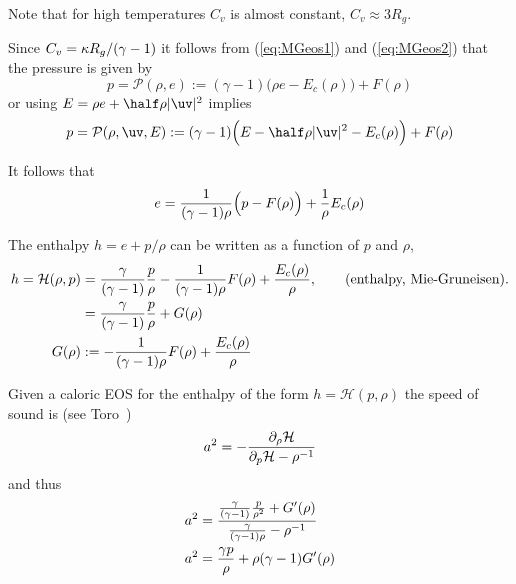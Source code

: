 \documentclass{article}
\begin{document}
Note that for high temperatures $C_v$ is almost constant, $C_v \approx 3 R_g$.

Since $C_v = {\kappa R_g/(\gamma-1)}$ it follows from (\ref{eq:MGeos1}) and (\ref{eq:MGeos2}) that 
the pressure is given by
\[
   p = {\mathcal P}(\rho,e) := (\gamma-1) \Big(\rho e  - E_c(\rho) \Big) + F(\rho)
\]
or using $E=\rho e + \half \rho |\uv|^2$ implies
\[
   p = {\mathcal P}(\rho,\uv,E) := (\gamma-1) \Big(E - \half \rho |\uv|^2  - E_c(\rho) \Big) + F(\rho)
\]

It follows that 
\begin{equation}
     e = {1\over(\gamma-1)\rho} \Big(p - F(\rho)\Big) +{1\over\rho} E_c(\rho)
\end{equation}

\newcommand{\Hc}{{\mathcal H}}
The enthalpy $h=e+p/\rho$ can be written as a function of $p$ and $\rho$,
\begin{align}
   h = \Hc(\rho,p) & = 
           {\gamma\over(\gamma-1)} {p\over\rho} - {1\over (\gamma-1)\rho} F(\rho) + {E_c(\rho)\over\rho},
                                    \qquad\mbox{(enthalpy, Mie-Gruneisen)}.    \label{eq:enthalpy} \\
        &=   {\gamma\over(\gamma-1)} {p\over\rho} + G(\rho) \\
  G(\rho) &:= - {1\over (\gamma-1)\rho} F(\rho) + {E_c(\rho)\over\rho}
\end{align}
    
 Given a caloric EOS for the enthalpy of the form $h=\Hc(p,\rho)$ the
speed of sound is (see Toro~\cite{Toro97})
\[
        a^2 =  - { \partial_\rho \Hc \over \partial_p \Hc - \rho^{-1} }
\]
and thus
\begin{align*}
   a^2 &= { {\gamma\over(\gamma-1)} {p\over\rho^2} + G'(\rho)
             \over 
             {\gamma\over(\gamma-1)\rho} - \rho^{-1} } \\
   a^2  &= {\gamma p\over\rho} +  \rho(\gamma-1)G'(\rho)
\end{align*}

\end{document}
